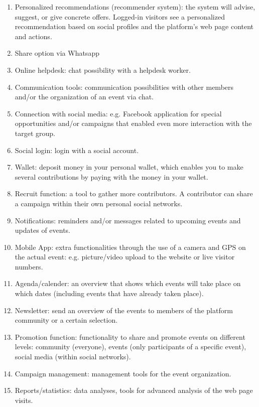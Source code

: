 \begin{enumerate}
    \item
          Personalized recommendations (recommender system): the system will advise, suggest, or give concrete offers. Logged-in visitors see a personalized recommendation based on social profiles and the
          platform’s web page content and actions.
    \item
          Share option via Whatsapp
    \item
          Online helpdesk: chat possibility with a helpdesk worker.
    \item
          Communication tools: communication possibilities with other members and/or the organization of an
          event via chat.
    \item
          Connection with social media: e.g. Facebook application for special opportunities and/or campaigns
          that enabled even more interaction with the target group.
    \item
          Social login: login with a social account.
    \item
          Wallet: deposit money in your personal wallet, which enables you to make several contributions by
          paying with the money in your wallet.
    \item
          Recruit function: a tool to gather more contributors. A contributor can share a campaign within their
          own personal social networks.
    \item
          Notifications: reminders and/or messages related to upcoming events and updates of events.
    \item
          Mobile App: extra functionalities through the use of a camera and GPS on the actual event: e.g. picture/video upload to the website or live visitor numbers.

    \item
          Agenda/calender: an overview that shows which events will take place on which dates (including events
          that have already taken place).
    \item
          Newsletter: send an overview of the events to members of the platform community or a certain
          selection.
    \item
          Promotion function: functionality to share and promote events on different levels: community (everyone), events (only participants of a specific event), social media (within social networks).
    \item
          Campaign management: management tools for the event organization.
    \item
          Reports/statistics: data analyses, tools for advanced analysis of the web page visits.
\end{enumerate}




